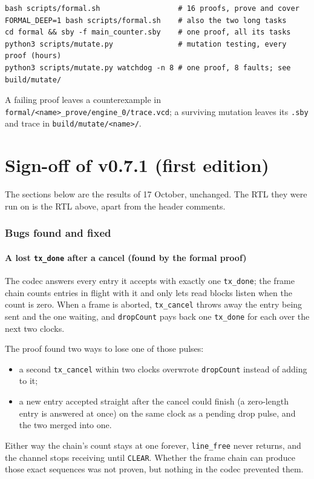 \documentclass[11pt,a4paper]{article}
\newcommand{\sig}[1]{\texttt{#1}}
\begin{document}
\begin{lstlisting}
bash scripts/formal.sh                  # 16 proofs, prove and cover
FORMAL_DEEP=1 bash scripts/formal.sh    # also the two long tasks
cd formal && sby -f main_counter.sby    # one proof, all its tasks
python3 scripts/mutate.py               # mutation testing, every proof (hours)
python3 scripts/mutate.py watchdog -n 8 # one proof, 8 faults; see build/mutate/
\end{lstlisting}

A failing proof leaves a counterexample in \sig{formal/<name>\_prove/engine\_0/trace.vcd}; a surviving mutation leaves its \sig{.sby} and trace in \sig{build/mutate/<name>/}.

\part{Sign-off of v0.7.1 (first edition)}\label{part:signoff}

The sections below are the results of 17 October, unchanged. The RTL they were run on is the RTL above, apart from the header comments.

\section{Bugs found and fixed}

\subsection{A lost \sig{tx\_done} after a cancel (found by the formal proof)}

The codec answers every entry it accepts with exactly one \sig{tx\_done}; the frame chain counts entries in flight with it and only lets read blocks listen when the count is zero. When a frame is aborted, \sig{tx\_cancel} throws away the entry being sent and the one waiting, and \sig{dropCount} pays back one \sig{tx\_done} for each over the next two clocks.

The proof found two ways to lose one of those pulses:
\begin{itemize}
\item a second \sig{tx\_cancel} within two clocks overwrote \sig{dropCount} instead of adding to it;
\item a new entry accepted straight after the cancel could finish (a zero-length entry is answered at once) on the same clock as a pending drop pulse, and the two merged into one.
\end{itemize}
Either way the chain's count stays at one forever, \sig{line\_free} never returns, and the channel stops receiving until \sig{CLEAR}. Whether the frame chain can produce those exact sequences was not proven, but nothing in the codec prevented them.
\end{document}
